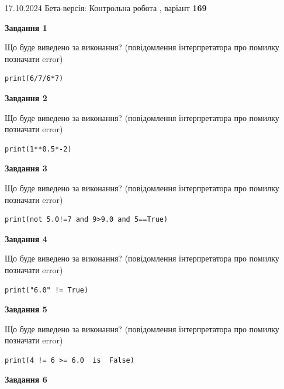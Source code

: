 \documentclass[12pt, ukrainian]{article}
\begin{document}
{\Large{17.10.2024 Бета-версія: Контрольна робота , варіант  \No \textbf { 169 }\par}}
{
\begin {large}
{\begin {center}\textbf{Завдання 1}\end {center}}

Що буде виведено за виконання? (повідомлення інтерпретатора про помилку позначати error)\par
\begin{verbatim}
print(6/7/6*7)
\end{verbatim}

{\begin {center}\textbf{Завдання 2}\end {center}}

Що буде виведено за виконання? (повідомлення інтерпретатора про помилку позначати error)\par
\begin{verbatim}
print(1**0.5*-2)
\end{verbatim}

{\begin {center}\textbf{Завдання 3}\end {center}}

Що буде виведено за виконання? (повідомлення інтерпретатора про помилку позначати error)\par
\begin{verbatim}
print(not 5.0!=7 and 9>9.0 and 5==True)
\end{verbatim}

{\begin {center}\textbf{Завдання 4}\end {center}}

Що буде виведено за виконання? (повідомлення інтерпретатора про помилку позначати error)\par
\begin{verbatim}
print("6.0" != True)
\end{verbatim}

{\begin {center}\textbf{Завдання 5}\end {center}}

Що буде виведено за виконання? (повідомлення інтерпретатора про помилку позначати error)\par
\begin{verbatim}
print(4 != 6 >= 6.0  is  False)
\end{verbatim}

{\begin {center}\textbf{Завдання 6}\end {center}}


\end{large}}
\end{document}
